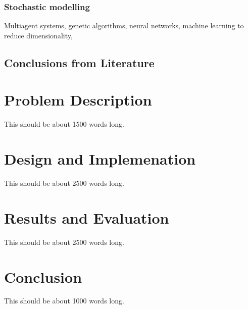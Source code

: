\documentclass[authoryearcitations]{UoYCSproject}
\begin{document}
\subsection{Stochastic modelling}
Multiagent systems, genetic algorithms, neural networks, machine learning to reduce dimensionality,

\section{Conclusions from Literature}


\chapter{Problem Description}
\label{cha:Problem Description}
This should be about 1500 words long.

\chapter{Design and Implemenation}
\label{cha:Design and Implementation}
This should be about 2500 words long.

\chapter{Results and Evaluation}
\label{cha:Results and Evaluation}
This should be about 2500 words long.

\chapter{Conclusion}
\label{cha:Conclusion}
This should be about 1000 words long.


 
\end{document}
